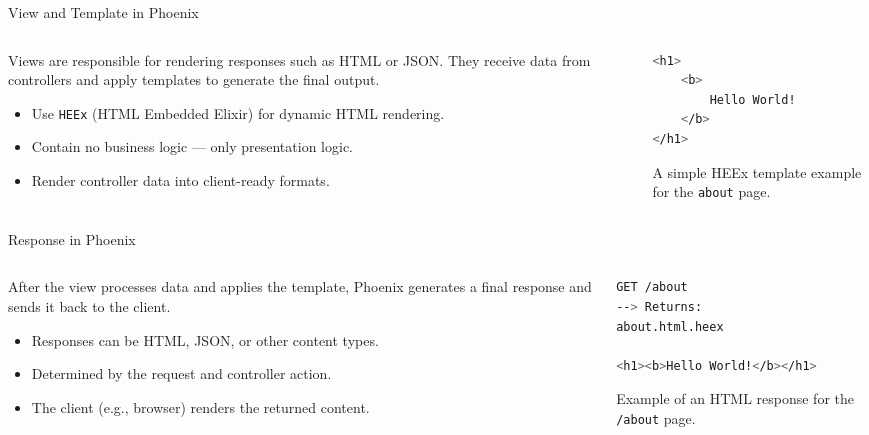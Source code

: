 \documentclass[aspectratio=169, table]{beamer}
\begin{document}
\begin{frame}[fragile]{View and Template in Phoenix}
\vspace*{20pt}

\begin{columns}
  \begin{column}[T]{0.6\textwidth}
    Views are responsible for rendering responses such as HTML or JSON.  
    They receive data from controllers and apply templates to generate the final output.

    \begin{itemize}
      \item Use \texttt{HEEx} (HTML Embedded Elixir) for dynamic HTML rendering.
      \item Contain no business logic — only presentation logic.
      \item Render controller data into client-ready formats.
    \end{itemize}
  \end{column}

  \begin{column}[T]{0.35\textwidth}

\begin{lstlisting}[language=bash]
<h1>
	<b>
		Hello World!
	</b>
</h1>
\end{lstlisting}

A simple HEEx template example  
for the \texttt{about} page.
  \end{column}
\end{columns}
\end{frame}

\begin{frame}[fragile]{Response in Phoenix}
\vspace*{20pt}

\begin{columns}
  \begin{column}[T]{0.52\textwidth}
    After the view processes data and applies the template,  
    Phoenix generates a final response and sends it back to the client.

    \begin{itemize}
      \item Responses can be HTML, JSON, or other content types.
      \item Determined by the request and controller action.
      \item The client (e.g., browser) renders the returned content.
    \end{itemize}
  \end{column}

  \begin{column}[T]{0.43\textwidth}
\begin{lstlisting}[language=bash]
GET /about
--> Returns:
about.html.heex

<h1><b>Hello World!</b></h1>
\end{lstlisting}

Example of an HTML response  
for the \texttt{/about} page.
  \end{column}
\end{columns}
\end{frame}
\end{document}
